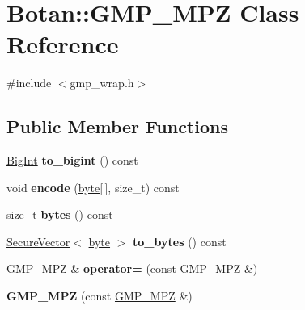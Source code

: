 \hypertarget{classBotan_1_1GMP__MPZ}{\section{Botan\-:\-:G\-M\-P\-\_\-\-M\-P\-Z Class Reference}
\label{classBotan_1_1GMP__MPZ}
}


{\ttfamily \#include $<$gmp\-\_\-wrap.\-h$>$}

\subsection*{Public Member Functions}
\begin{DoxyCompactItemize}
\item 
\hypertarget{classBotan_1_1GMP__MPZ_a4cb3b76e795aedfaa019708852a3c961}{\hyperlink{classBotan_1_1BigInt}{Big\-Int} {\bfseries to\-\_\-bigint} () const }\label{classBotan_1_1GMP__MPZ_a4cb3b76e795aedfaa019708852a3c961}

\item 
\hypertarget{classBotan_1_1GMP__MPZ_a81c6e9347acb7e8481285d9b02fd4db3}{void {\bfseries encode} (\hyperlink{namespaceBotan_a7d793989d801281df48c6b19616b8b84}{byte}\mbox{[}$\,$\mbox{]}, size\-\_\-t) const }\label{classBotan_1_1GMP__MPZ_a81c6e9347acb7e8481285d9b02fd4db3}

\item 
\hypertarget{classBotan_1_1GMP__MPZ_aa7e37cf8d3f30a00ebc4eb761a9b40d1}{size\-\_\-t {\bfseries bytes} () const }\label{classBotan_1_1GMP__MPZ_aa7e37cf8d3f30a00ebc4eb761a9b40d1}

\item 
\hypertarget{classBotan_1_1GMP__MPZ_a2d3634e2eb945c988045dd3009b261e8}{\hyperlink{classBotan_1_1SecureVector}{Secure\-Vector}$<$ \hyperlink{namespaceBotan_a7d793989d801281df48c6b19616b8b84}{byte} $>$ {\bfseries to\-\_\-bytes} () const }\label{classBotan_1_1GMP__MPZ_a2d3634e2eb945c988045dd3009b261e8}

\item 
\hypertarget{classBotan_1_1GMP__MPZ_ac5d4b1fdc048437f2e44d04910e672b8}{\hyperlink{classBotan_1_1GMP__MPZ}{G\-M\-P\-\_\-\-M\-P\-Z} \& {\bfseries operator=} (const \hyperlink{classBotan_1_1GMP__MPZ}{G\-M\-P\-\_\-\-M\-P\-Z} \&)}\label{classBotan_1_1GMP__MPZ_ac5d4b1fdc048437f2e44d04910e672b8}

\item 
\hypertarget{classBotan_1_1GMP__MPZ_a60c34ad4108acda4669ab2a6c4e174b2}{{\bfseries G\-M\-P\-\_\-\-M\-P\-Z} (const \hyperlink{classBotan_1_1GMP__MPZ}{G\-M\-P\-\_\-\-M\-P\-Z} \&)}\label{classBotan_1_1GMP__MPZ_a60c34ad4108acda4669ab2a6c4e174b2}


\end{DoxyCompactItemize}
